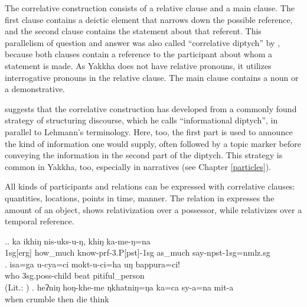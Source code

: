 The correlative construction consists of a relative clause and a main clause. The first clause contains  a deictic element that narrows down the possible reference, and the second clause contains the statement about that referent. This parallelism of question and answer was also called  “correlative diptych” by \citet{Lehmann1988Towards}, because both clauses contain a reference to the participant about whom a statement is made. As Yakkha does not have relative pronouns, it utilizes interrogative pronouns in the relative clause. The main clause contains a noun or a demonstrative. 

\citet[25]{Bickel1999Principles} suggests that the correlative construction has developed from a commonly found strategy of structuring discourse, which he calls “informational diptych”, in parallel to Lehmann's terminology. Here, too, the first part is used to announce the kind of information one would supply, often followed by a topic marker before conveying the information in the second part of the diptych. This strategy is common in Yakkha, too, especially in narratives (see Chapter \ref{particles}). 

All kinds of participants and relations can be expressed with correlative clauses: quantities, locations, points in time, manner. The relation in  \Next[a] expresses the amount of an object, \Next[b] shows relativization over a possessor, while \Next[c] relativizes over a temporal reference.

\ex.\ag. ka  ikhiŋ  nis-uks-u-ŋ, khiŋ  ka-me-ŋ=na\\
		{\sc 1sg[erg]} how\_much know{\sc -prf-3.P[pst]-1sg} as\_much say-{\sc npst-1sg=nmlz.sg}\\
		\bg.  isa=ga     u-cya=ci  mokt-u-ci=ha  uŋ  bappura=ci!\\
		who {\sc 3sg.poss-}child  beat  pitiful\_person\\
		 (Lit.: )
		\bg.  heʔniŋ  hoŋ-khe-me  ŋkhatniŋ=ŋa     ka=ca         sy-a=na                    mit-a\\
		when crumble then  die think\\
		
